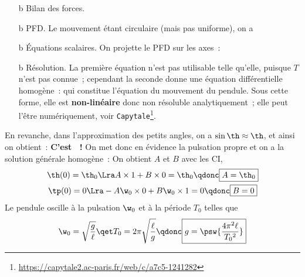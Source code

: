 \documentclass[../../main/main.tex]{subfiles}
\begin{document}
\begin{minipage}{0.25\linewidth}
\begin{center}
{		}
		\vspace{-15pt}
	\end{center}
\end{minipage}
\begin{enumerate}[label=\sqenumi, start=4]
	\item[b]{Bilan des forces.}
	      \psw{
		      \[
			      \begin{array}{ll}
				      \textbf{Poids}   & \Pf = m\gf = mg(\cos\th \ur - \sin\th \ut)
				      \\
				      \textbf{Tension} & \Tf = -T\ur
			      \end{array}
		      \]
	      }
	\item[b]{PFD.}
	      \psw{
		      \[m\af = \Pf + \Tf\]
	      }
	      Le mouvement étant circulaire (mais pas uniforme), on a
	      \psw{
		      \[\af = -\ell\tp^2 \ur + \ell\tpp \ut\]
	      }
	\item[b]{Équations scalaires.} On projette le PFD sur les axes~:
	      \psw{
		      \[
			      \left\{
			      \begin{array}{rcl}
				      -m\ell\tp^2 & = & mg\cos\th - T \\
				      m\ell\tpp   & = & -mg\sin\th
			      \end{array}
			      \right.
		      \]
	      }
	\item[b]{Résolution.} La première équation n'est pas utilisable telle qu'elle,
	      puisque $T$ n'est pas connue~; cependant la seconde donne une équation
	      différentielle homogène~:
	      \psw{
		      \[\boxed{\tpp + \frac{g}{\ell}\sin\th = 0}\]
	      }
	      qui constitue l'équation du mouvement du pendule. Sous cette forme, elle
	      est \textbf{non-linéaire} donc non résoluble analytiquement~; elle peut
	      l'être numériquement, voir
	      \texttt{Capytale}\footnote{\url{
			      https://capytale2.ac-paris.fr/web/c/a7c5-1241282}}.
\end{enumerate}
En revanche, dans l'approximation des petits angles, on a $\sin\th\approx\th$,
et ainsi on obtient~:
\psw{
	\[\boxed{\tpp + \frac{g}{\ell}\th = 0}\]
}
\textbf{C'est ~!} On
met donc en évidence la pulsation propre
\psw{
	\[\w_0 = \sqrt{\frac{g}{\ell}}\]
}
et on a la solution générale homogène~:
\psw{
	\[\th(t) = A\cos(\w_0t) + B\sin(\w_0t)\]
}
On obtient $A$ et $B$ avec les CI,
\begin{gather*}
	\th(0) = \th_0
	\Lra A\times 1 + B\times 0 = \th_0
	\qdonc
	\boxed{A = \th_0}\\
	\tp(0) = 0
	\Lra -A\w_0\times 0 + B\w_0\times 1 = 0
	\qdonc
	\boxed{B = 0}
\end{gather*}
Le pendule oscille à la pulsation $\w_0$ et à la période $T_0$ telles que
\[
	\w_0 = \sqrt{\frac{g}{\ell}}
	\qet
	T_0 = 2\pi \sqrt{\frac{\ell}{g}}
	\qdonc
	\boxed{g = \psw{\frac{4\pi^2\ell}{T_0{}^2}}}
\]
\end{document}
